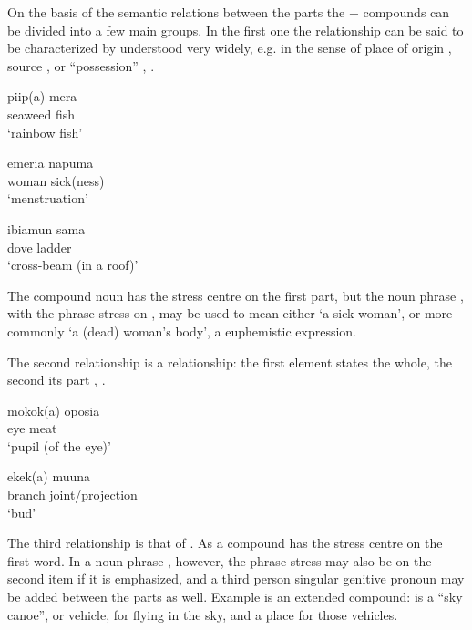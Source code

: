 On the basis of the semantic relations between the parts the + compounds can be divided into a few main groups. In the first one the relationship can be said to be characterized by  understood very widely, e.g. in the sense of place of origin , source , or ``possession'' , . 

\ea%
\label{ex:3:x37}
\gll piip(a) mera \\
seaweed fish\\
\glt`rainbow fish'
\z

\ea%
\label{ex:3:x40}
\gll emeria napuma \\
woman sick(ness)\\
\glt`menstruation'
\z

\ea%
\label{ex:3:x41}
\gll ibiamun sama \\
dove ladder\\
\glt`cross-beam (in a roof)'
\z

The compound noun  has the stress centre on the first part, but the noun phrase , with the phrase stress on , may be used to mean either `a sick woman', or more commonly `a (dead) woman's body', a euphemistic expression. 

The second relationship is a  relationship: the first element states the whole, the second its part , .

\ea%
\label{ex:3:x42}
\gll mokok(a) oposia \\
eye meat\\
\glt`pupil (of the eye)'
\z

\ea%
\label{ex:3:x43}
\gll ekek(a) muuna \\
branch joint/projection\\
\glt`bud'
\z

The third relationship is that of . As a compound   has the stress centre on the first word. In a noun phrase , however, the phrase stress may also be on the second item if it is emphasized, and a third person singular genitive pronoun may be added between the parts as well. Example  is an extended compound:  is a ``sky canoe'', or vehicle, for flying in the sky, and  a place for those vehicles.

